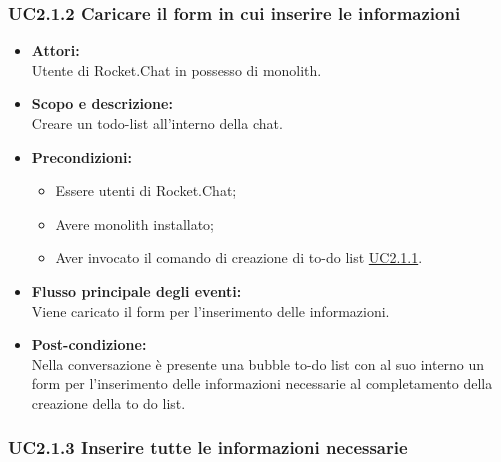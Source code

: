 \subsubsection{UC2.1.2 Caricare il form in cui inserire le informazioni} \label{UC2.1.2}

\begin{itemize}
	\item \textbf{Attori:}
	\\Utente di Rocket.Chat in possesso di monolith.
	\item \textbf{Scopo e descrizione:} 
	\\Creare un todo-list all'interno della chat.
	\item \textbf{Precondizioni:}
	\begin{itemize}
		\item Essere utenti di Rocket.Chat;
		\item Avere monolith installato;
		\item Aver invocato il comando di creazione di to-do list \hyperref[UC2.1.1]{UC2.1.1}.
	\end{itemize}
	\item \textbf{Flusso principale degli eventi:}
	\\Viene caricato il form per l’inserimento delle informazioni.
	\item \textbf{Post-condizione:}
	\\Nella conversazione è presente una bubble to-do list con al suo interno un form per l'inserimento delle informazioni necessarie al completamento della creazione della to do list.
\end{itemize}

\subsubsection{UC2.1.3 Inserire tutte le informazioni necessarie} \label{UC2.1.3}


